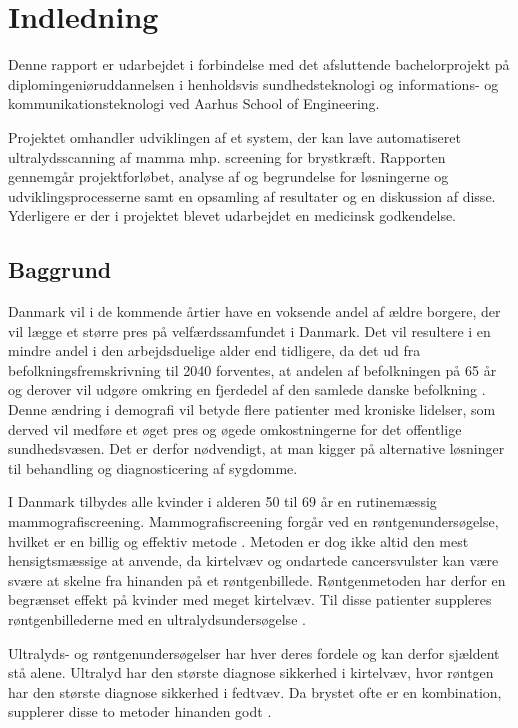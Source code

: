 \chapter{Indledning}
Denne rapport er udarbejdet i forbindelse med det afsluttende bachelorprojekt på diplomingeniøruddannelsen i henholdsvis sundhedsteknologi og informations- og kommunikationsteknologi ved Aarhus School of Engineering.

Projektet omhandler udviklingen af et system, der kan lave automatiseret ultralydsscanning af mamma mhp. screening for brystkræft. Rapporten gennemgår projektforløbet, analyse af og begrundelse for løsningerne og udviklingsprocesserne samt en opsamling af resultater og en diskussion af disse. Yderligere er der i projektet blevet udarbejdet en medicinsk godkendelse. 

\section{Baggrund}
Danmark vil i de kommende årtier have en voksende andel af ældre borgere, der vil lægge et større pres på velfærdssamfundet i Danmark. Det vil resultere i en mindre andel i den arbejdsduelige alder end tidligere, da det ud fra befolkningsfremskrivning til 2040 forventes, at andelen af befolkningen på 65 år og derover vil udgøre omkring en fjerdedel af den samlede danske befolkning \cite{Befolk}. Denne ændring i demografi vil betyde flere patienter med kroniske lidelser, som derved vil medføre et øget pres og øgede omkostningerne for det offentlige sundhedsvæsen. Det er derfor nødvendigt, at man kigger på alternative løsninger til behandling og diagnosticering af sygdomme. 

I Danmark tilbydes alle kvinder i alderen 50 til 69 år en rutinemæssig mammografiscreening. Mammografiscreening forgår ved en røntgenundersøgelse, hvilket er en billig og effektiv metode \cite{Afsloring}. Metoden er dog ikke altid den mest hensigtsmæssige at anvende, da kirtelvæv og ondartede cancersvulster kan være svære at skelne fra hinanden på et røntgenbillede. Røntgenmetoden har derfor en begrænset effekt på kvinder med meget kirtelvæv. Til disse patienter suppleres røntgenbillederne med en ultralydsundersøgelse \cite{Ultralyd}.

Ultralyds- og røntgenundersøgelser har hver deres fordele og kan derfor sjældent stå alene. Ultralyd har den største diagnose sikkerhed i kirtelvæv, hvor røntgen har den største diagnose sikkerhed i fedtvæv. Da brystet ofte er en kombination, supplerer disse to metoder hinanden godt \cite{Ultralyd}. 

